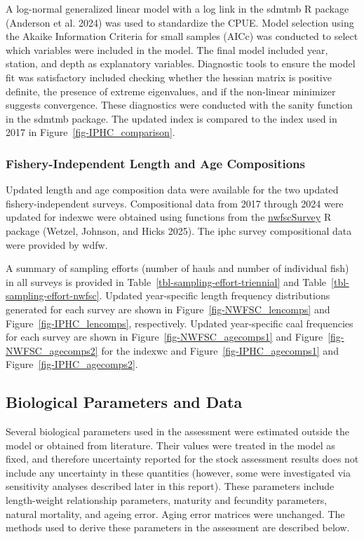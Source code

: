 \documentclass[
]{scrartcl}
\begin{document}
A log-normal generalized linear model with a log link in the
\gls{sdmtmb} R package (Anderson et al. 2024) was used to standardize
the CPUE. Model selection using the Akaike Information Criteria for
small samples (AICc) was conducted to select which variables were
included in the model. The final model included year, station, and depth
as explanatory variables. Diagnostic tools to ensure the model fit was
satisfactory included checking whether the hessian matrix is positive
definite, the presence of extreme eigenvalues, and if the non-linear
minimizer suggests convergence. These diagnostics were conducted with
the sanity function in the \gls{sdmtmb} package. The updated index is
compared to the index used in 2017 in Figure~\ref{fig-IPHC_comparison}.

\subsubsection{Fishery-Independent Length and Age
Compositions}\label{fishery-independent-length-and-age-compositions}

Updated length and age composition data were available for the two
updated fishery-independent surveys. Compositional data from 2017
through 2024 were updated for \gls{indexwc} were obtained using
functions from the
\href{https://github.com/pfmc-assessments/nwfscSurvey}{nwfscSurvey} R
package (Wetzel, Johnson, and Hicks 2025). The \gls{iphc} survey
compositional data were provided by \gls{wdfw}.

A summary of sampling efforts (number of hauls and number of individual
fish) in all surveys is provided in
Table~\ref{tbl-sampling-effort-triennial} and
Table~\ref{tbl-sampling-effort-nwfsc}. Updated year-specific length
frequency distributions generated for each survey are shown in
Figure~\ref{fig-NWFSC_lencomps} and Figure~\ref{fig-IPHC_lencomps},
respectively. Updated year-specific \gls{caal} frequencies for each
survey are shown in Figure~\ref{fig-NWFSC_agecomps1} and
Figure~\ref{fig-NWFSC_agecomps2} for the \gls{indexwc} and
Figure~\ref{fig-IPHC_agecomps1} and Figure~\ref{fig-IPHC_agecomps2}.

\subsection{Biological Parameters and
Data}\label{biological-parameters-and-data}

Several biological parameters used in the assessment were estimated
outside the model or obtained from literature. Their values were treated
in the model as fixed, and therefore uncertainty reported for the stock
assessment results does not include any uncertainty in these quantities
(however, some were investigated via sensitivity analyses described
later in this report). These parameters include length-weight
relationship parameters, maturity and fecundity parameters, natural
mortality, and ageing error. Aging error matrices were unchanged. The
methods used to derive these parameters in the assessment are described
below.
\end{document}
